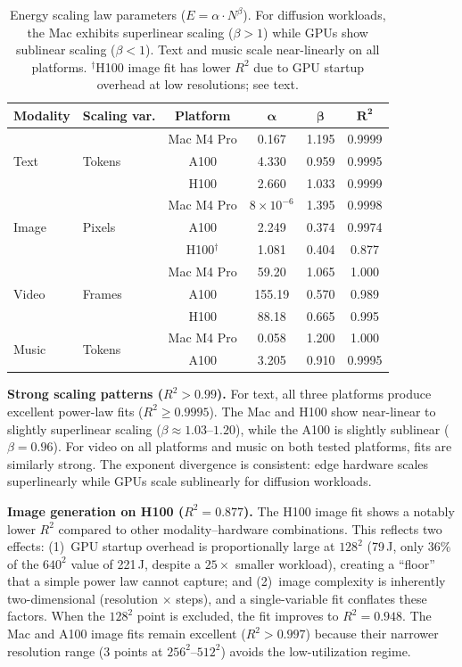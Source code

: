\documentclass[acmlarge,manuscript,screen,review]{acmart}
\begin{document}
\begin{table}[t]
\centering
\caption{Energy scaling law parameters ($E = \alpha \cdot N^\beta$). For diffusion workloads, the Mac exhibits superlinear scaling ($\beta > 1$) while GPUs show sublinear scaling ($\beta < 1$). Text and music scale near-linearly on all platforms. $^\dagger$H100 image fit has lower $R^2$ due to GPU startup overhead at low resolutions; see text.}
\label{tab:scaling}
\small
\begin{tabular}{@{}llcccc@{}}
\toprule
\textbf{Modality} & \textbf{Scaling var.} & \textbf{Platform} & $\boldsymbol{\alpha}$ & $\boldsymbol{\beta}$ & $\boldsymbol{R^2}$ \\
\midrule
\multirow{3}{*}{Text} & \multirow{3}{*}{Tokens} & Mac M4 Pro & 0.167 & 1.195 & 0.9999 \\
 & & A100 & 4.330 & 0.959 & 0.9995 \\
 & & H100 & 2.660 & 1.033 & 0.9999 \\
\midrule
\multirow{3}{*}{Image} & \multirow{3}{*}{Pixels} & Mac M4 Pro & $8 \times 10^{-6}$ & 1.395 & 0.9998 \\
 & & A100 & 2.249 & 0.374 & 0.9974 \\
 & & H100$^\dagger$ & 1.081 & 0.404 & 0.877 \\
\midrule
\multirow{3}{*}{Video} & \multirow{3}{*}{Frames} & Mac M4 Pro & 59.20 & 1.065 & 1.000 \\
 & & A100 & 155.19 & 0.570 & 0.989 \\
 & & H100 & 88.18 & 0.665 & 0.995 \\
\midrule
\multirow{2}{*}{Music} & \multirow{2}{*}{Tokens} & Mac M4 Pro & 0.058 & 1.200 & 1.000 \\
 & & A100 & 3.205 & 0.910 & 0.9995 \\
\bottomrule
\end{tabular}
\end{table}

\textbf{Strong scaling patterns ($R^2 > 0.99$).}\quad
For text, all three platforms produce excellent power-law fits ($R^2 \geq 0.9995$). The Mac and H100 show near-linear to slightly superlinear scaling ($\beta \approx 1.03$--$1.20$), while the A100 is slightly sublinear ($\beta = 0.96$). For video on all platforms and music on both tested platforms, fits are similarly strong. The exponent divergence is consistent: edge hardware scales superlinearly while GPUs scale sublinearly for diffusion workloads.

\textbf{Image generation on H100 ($R^2 = 0.877$).}\quad
The H100 image fit shows a notably lower $R^2$ compared to other modality--hardware combinations. This reflects two effects: (1)~GPU startup overhead is proportionally large at $128^2$ (79\,J, only $36\%$ of the $640^2$ value of 221\,J, despite a $25\times$ smaller workload), creating a ``floor'' that a simple power law cannot capture; and (2)~image complexity is inherently two-dimensional (resolution $\times$ steps), and a single-variable fit conflates these factors. When the $128^2$ point is excluded, the fit improves to $R^2 = 0.948$. The Mac and A100 image fits remain excellent ($R^2 > 0.997$) because their narrower resolution range (3 points at $256^2$--$512^2$) avoids the low-utilization regime.
\end{document}
